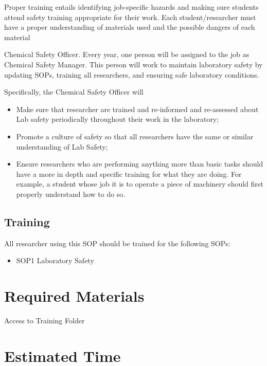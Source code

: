\documentclass[12pt]{../SOP2}
\begin{document}
\NP Proper training entails identifying job-specific hazards and making sure students attend safety training appropriate for their work. Each student/researcher must have a proper understanding of materials used and the possible dangers of each material

\NP Chemical Safety Officer. Every year, one person will be assigned to the job as Chemical Safety Manager. This person will work to maintain laboratory safety by updating SOPs, training all researchers, and ensuring safe laboratory conditions.

\NP Specifically, the Chemical Safety Officer will 

\begin{itemize}
  \item Make sure that researcher are trained and re-informed and re-assessed about Lab safety periodically throughout their work in the laboratory;
  \item Promote a culture of safety so that all researchers have the same or similar understanding of Lab Safety;
  \item Ensure researchers who are performing anything more than basic tasks should have a more in depth and specific training for what they are doing. For example, a student whose job it is to operate a piece of machinery should first properly understand how to do so.

\end{itemize}

\subsection*{Training}

\NP All researcher using this SOP should be trained for the following SOPs:

\begin{itemize}
  \item SOP1 Laboratory Safety
\end{itemize}

\section{Required Materials}

\NP Access to Training Folder

\section{Estimated Time}
\end{document}
